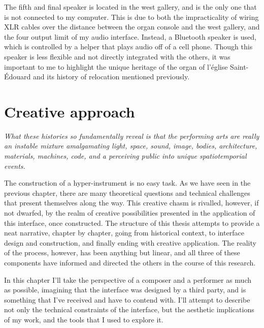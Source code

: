 \documentclass[12pt,twoside,maitrise]{dms_ks}
\theoremstyle{definition}
\begin{document}
{The fifth and final speaker is located in the west gallery, and is the only one that is not connected to my computer.
This is due to both the impracticality of wiring XLR cables over the distance between the organ console and the west gallery, and the four output limit of my audio interface.
Instead, a Bluetooth speaker is used, which is controlled by a helper that plays audio off of a cell phone.
Though this speaker is less flexible and not directly integrated with the others, it was important to me to highlight the unique heritage of the organ of l'église Saint-Édouard and its history of relocation mentioned previously. 



\chapter{Creative approach}

\epigraph{\textit{What these histories so fundamentally reveal is that the performing arts are really an instable mixture amalgamating light, space, sound, image, bodies, architecture, materials, machines, code, and a perceiving public into unique spatiotemporial events.}\protect\footnotemark}{}


The construction of a hyper-instrument is no easy task.
As we have seen in the previous chapter, there are many theoretical questions and technical challenges that present themselves along the way.
This creative chasm is rivalled, however, if not dwarfed, by the realm of creative possibilities presented in the application of this interface, once constructed.
The structure of this thesis attempts to provide a neat narrative, chapter by chapter, going from historical context, to interface design and construction, and finally ending with creative application.
The reality of the process, however, has been anything but linear, and all three of these components have informed and directed the others in the course of this research.

In this chapter I’ll take the perspective of a composer and a performer as much as possible, imagining that the interface was designed by a third party, and is something that I’ve received and have to contend with.
I’ll attempt to describe not only the technical constraints of the interface, but the aesthetic implications of my work, and the tools that I used to explore it.

}
\end{document}
